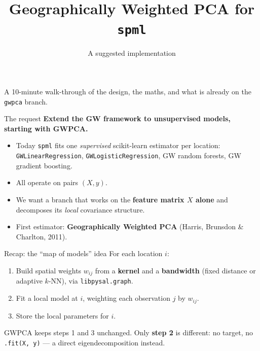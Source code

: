 \documentclass[10pt]{beamer}
\title[GWPCA in spml]{Geographically Weighted PCA for \texttt{spml}}
\subtitle{A suggested implementation}
\author{}
\institute{PySAL --- SDSU spatial-ML group}
\date{}
\begin{document}
\begin{frame}
  \titlepage
  \begin{center}
    \small A 10-minute walk-through of the design, the maths, and what is
    already on the \texttt{gwpca} branch.
  \end{center}
\end{frame}

\begin{frame}{The request}
  \textbf{Extend the GW framework to unsupervised models,
  starting with GWPCA.}
  \begin{itemize}
    \item Today \texttt{spml} fits one \emph{supervised} scikit-learn
      estimator per location: \texttt{GWLinearRegression},
      \texttt{GWLogisticRegression}, GW random forests, GW gradient boosting.
    \item All operate on pairs $(X, y)$.
    \item We want a branch that works on the \textbf{feature matrix $X$
      alone} and decomposes its \emph{local} covariance structure.
    \item First estimator: \textbf{Geographically Weighted PCA}
      \footnotesize (Harris, Brunsdon \& Charlton, 2011).
  \end{itemize}
\end{frame}

\begin{frame}{Recap: the ``map of models'' idea}
  For each location $i$:
  \begin{enumerate}
    \item Build spatial weights $w_{ij}$ from a \textbf{kernel} and a
      \textbf{bandwidth} (fixed distance or adaptive $k$-NN), via
      \texttt{libpysal.graph}.
    \item Fit a local model at $i$, weighting each observation $j$ by
      $w_{ij}$.
    \item Store the local parameters for $i$.
  \end{enumerate}
  \vspace{0.6em}
  GWPCA keeps steps 1 and 3 unchanged. Only \textbf{step 2} is different:
  no target, no \texttt{.fit(X, y)} --- a direct eigendecomposition instead.
\end{frame}
\end{document}
